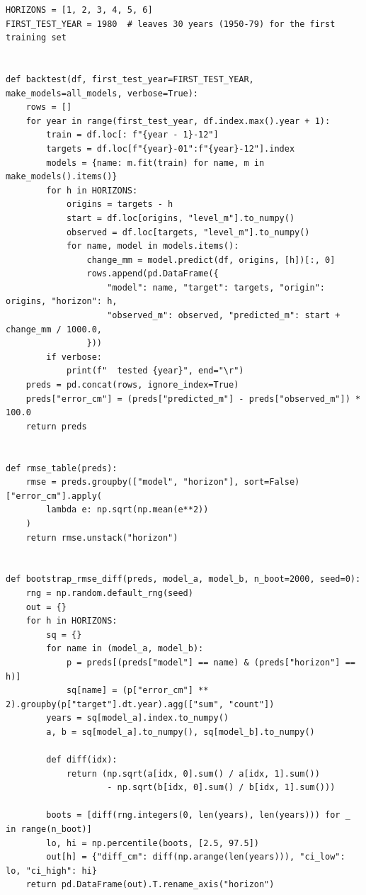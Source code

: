 \documentclass{article}
\begin{document}
\begin{lstlisting}[caption={Rolling-origin backtest, RMSE, the bootstrap, tuning gradient boosting and data delays}]
HORIZONS = [1, 2, 3, 4, 5, 6]
FIRST_TEST_YEAR = 1980  # leaves 30 years (1950-79) for the first training set


def backtest(df, first_test_year=FIRST_TEST_YEAR, make_models=all_models, verbose=True):
    rows = []
    for year in range(first_test_year, df.index.max().year + 1):
        train = df.loc[: f"{year - 1}-12"]
        targets = df.loc[f"{year}-01":f"{year}-12"].index
        models = {name: m.fit(train) for name, m in make_models().items()}
        for h in HORIZONS:
            origins = targets - h
            start = df.loc[origins, "level_m"].to_numpy()
            observed = df.loc[targets, "level_m"].to_numpy()
            for name, model in models.items():
                change_mm = model.predict(df, origins, [h])[:, 0]
                rows.append(pd.DataFrame({
                    "model": name, "target": targets, "origin": origins, "horizon": h,
                    "observed_m": observed, "predicted_m": start + change_mm / 1000.0,
                }))
        if verbose:
            print(f"  tested {year}", end="\r")
    preds = pd.concat(rows, ignore_index=True)
    preds["error_cm"] = (preds["predicted_m"] - preds["observed_m"]) * 100.0
    return preds


def rmse_table(preds):
    rmse = preds.groupby(["model", "horizon"], sort=False)["error_cm"].apply(
        lambda e: np.sqrt(np.mean(e**2))
    )
    return rmse.unstack("horizon")


def bootstrap_rmse_diff(preds, model_a, model_b, n_boot=2000, seed=0):
    rng = np.random.default_rng(seed)
    out = {}
    for h in HORIZONS:
        sq = {}
        for name in (model_a, model_b):
            p = preds[(preds["model"] == name) & (preds["horizon"] == h)]
            sq[name] = (p["error_cm"] ** 2).groupby(p["target"].dt.year).agg(["sum", "count"])
        years = sq[model_a].index.to_numpy()
        a, b = sq[model_a].to_numpy(), sq[model_b].to_numpy()

        def diff(idx):
            return (np.sqrt(a[idx, 0].sum() / a[idx, 1].sum())
                    - np.sqrt(b[idx, 0].sum() / b[idx, 1].sum()))

        boots = [diff(rng.integers(0, len(years), len(years))) for _ in range(n_boot)]
        lo, hi = np.percentile(boots, [2.5, 97.5])
        out[h] = {"diff_cm": diff(np.arange(len(years))), "ci_low": lo, "ci_high": hi}
    return pd.DataFrame(out).T.rename_axis("horizon")



\end{lstlisting}
\end{document}
